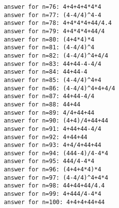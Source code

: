 \documentclass{article}
\begin{document}
\begin{verbatim}
			answer for n=76: 4+4+4+4*4*4
			answer for n=77: (4-4/4)^4-4
			answer for n=78: 4+4*4*4+44/4.4
			answer for n=79: 4+4*4*4+44/4
			answer for n=80: (4+4*4)*4
			answer for n=81: (4-4/4)^4
			answer for n=82: (4-4/4)^4+4/4
			answer for n=83: 44+44-4-4/4
			answer for n=84: 44+44-4
			answer for n=85: (4-4/4)^4+4
			answer for n=86: (4-4/4)^4+4+4/4
			answer for n=87: 44+44-4/4
			answer for n=88: 44+44
			answer for n=89: 4/4+44+44
			answer for n=90: (4+4)/4+44+44
			answer for n=91: 4+44+44-4/4
			answer for n=92: 4+44+44
			answer for n=93: 4+4/4+44+44
			answer for n=94: (444-4)/4-4*4
			answer for n=95: 444/4-4*4
			answer for n=96: (4+4+4*4)*4
			answer for n=97: (4-4/4)^4+4*4
			answer for n=98: 44+44+44/4.4
			answer for n=99: 4+444/4-4*4
			answer for n=100: 4+4+4+44+44
		\end{verbatim}
\end{document}
